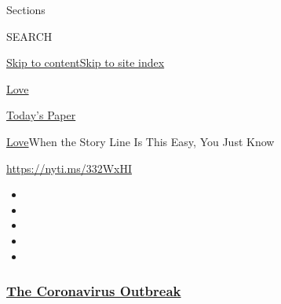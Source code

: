 Sections

SEARCH

\protect\hyperlink{site-content}{Skip to
content}\protect\hyperlink{site-index}{Skip to site index}

\href{https://www.nytimes3xbfgragh.onion/section/fashion/weddings}{Love}

\href{https://myaccount.nytimes3xbfgragh.onion/auth/login?response_type=cookie\&client_id=vi}{}

\href{https://www.nytimes3xbfgragh.onion/section/todayspaper}{Today's
Paper}

\href{/section/fashion/weddings}{Love}\textbar{}When the Story Line Is
This Easy, You Just Know

\url{https://nyti.ms/332WxHI}

\begin{itemize}
\item
\item
\item
\item
\item
\end{itemize}

\hypertarget{the-coronavirus-outbreak}{%
\subsubsection{\texorpdfstring{\href{https://www.nytimes3xbfgragh.onion/news-event/coronavirus?name=styln-coronavirus-national\&region=TOP_BANNER\&block=storyline_menu_recirc\&action=click\&pgtype=Article\&impression_id=39088510-f295-11ea-9b1f-ab8611e6ed59\&variant=undefined}{The
Coronavirus
Outbreak}}{The Coronavirus Outbreak}}\label{the-coronavirus-outbreak}}

